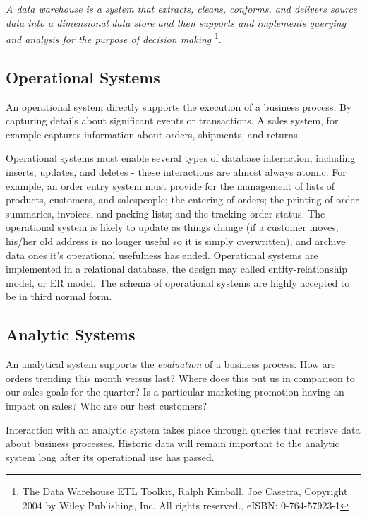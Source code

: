 \documentclass[letterpaper,12pt,oneside]{sphinxmanual}
\begin{document}
\emph{A data warehouse is a system that extracts, cleans, conforms, and delivers source data into a dimensional data store and then supports and implements querying and analysis for the purpose of decision making} \footnote[5]{\sphinxAtStartFootnote%
The Data Warehouse ETL Toolkit, Ralph Kimball, Joe Casetra, Copyright 2004 by Wiley Publishing, Inc. All rights reserved., eISBN: 0-764-57923-1
}.


\subsection{Operational Systems}
\label{introduction:operational-systems}
An operational system directly supports the execution of a business process.
By capturing details about significant events or transactions.
A sales system, for example captures information about orders, shipments, and returns.

Operational systems must enable several types of database interaction, including inserts, updates,
and deletes - these interactions are almost always atomic.
For example, an order entry system must provide for the management of lists of products, customers,
and salespeople; the entering of orders; the printing of order summaries, invoices, and packing
lists; and the tracking order status. The operational system is likely to update as things change
(if a customer moves, his/her old address is no longer useful so it is simply overwritten),
and archive data ones it’s operational usefulness has ended.
Operational systems are implemented in a relational database, the design may called entity-relationship model,
or ER model. The schema of operational systems are highly accepted to be in third normal form.


\subsection{Analytic Systems}
\label{introduction:analytic-systems}
An analytical system supports the \emph{evaluation} of a business process.
How are orders trending this month versus last?
Where does this put us in comparison to our sales goals for the quarter?
Is a particular marketing promotion having an impact on sales? Who are our best customers?

Interaction with an analytic system takes place through queries that retrieve data
about business processes. Historic data will remain important to the analytic system long after
its operational use has passed.
\end{document}
